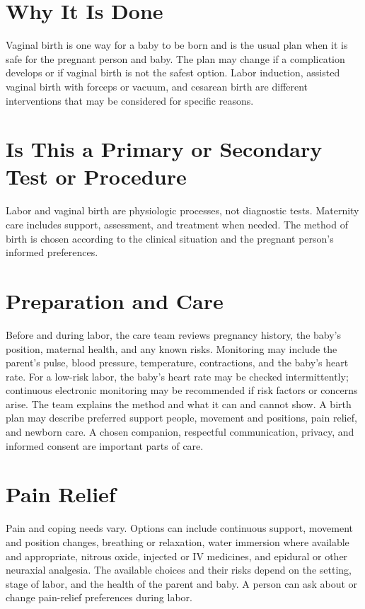 \section*{Why It Is Done}
Vaginal birth is one way for a baby to be born and is the usual plan when it is safe for the pregnant person and baby. The plan may change if a complication develops or if vaginal birth is not the safest option. Labor induction, assisted vaginal birth with forceps or vacuum, and cesarean birth are different interventions that may be considered for specific reasons.

\section*{Is This a Primary or Secondary Test or Procedure}
Labor and vaginal birth are physiologic processes, not diagnostic tests. Maternity care includes support, assessment, and treatment when needed. The method of birth is chosen according to the clinical situation and the pregnant person's informed preferences.

\section*{Preparation and Care}
Before and during labor, the care team reviews pregnancy history, the baby's position, maternal health, and any known risks. Monitoring may include the parent's pulse, blood pressure, temperature, contractions, and the baby's heart rate. For a low-risk labor, the baby's heart rate may be checked intermittently; continuous electronic monitoring may be recommended if risk factors or concerns arise. The team explains the method and what it can and cannot show. A birth plan may describe preferred support people, movement and positions, pain relief, and newborn care. A chosen companion, respectful communication, privacy, and informed consent are important parts of care.

\section*{Pain Relief}
Pain and coping needs vary. Options can include continuous support, movement and position changes, breathing or relaxation, water immersion where available and appropriate, nitrous oxide, injected or IV medicines, and epidural or other neuraxial analgesia. The available choices and their risks depend on the setting, stage of labor, and the health of the parent and baby. A person can ask about or change pain-relief preferences during labor.

